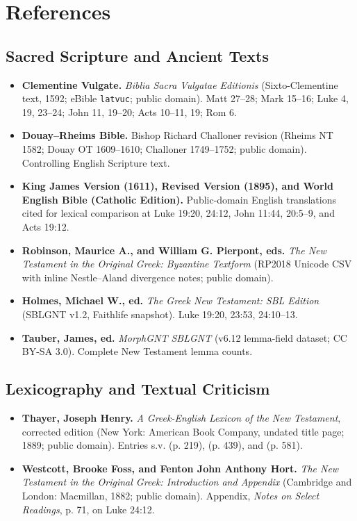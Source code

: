 \section{References}
\label{app:references}

\subsection{Sacred Scripture and Ancient Texts}

\begin{itemize}
\item \textbf{Clementine Vulgate.} \emph{Biblia Sacra Vulgatae Editionis} (Sixto-Clementine text, 1592; eBible \texttt{latvuc}; public domain). Matt 27--28; Mark 15--16; Luke 4, 19, 23--24; John 11, 19--20; Acts 10--11, 19; Rom 6.
\item \textbf{Douay--Rheims Bible.} Bishop Richard Challoner revision (Rheims NT 1582; Douay OT 1609--1610; Challoner 1749--1752; public domain). Controlling English Scripture text.
\item \textbf{King James Version (1611), Revised Version (1895), and World English Bible (Catholic Edition).} Public-domain English translations cited for lexical comparison at Luke 19:20, 24:12, John 11:44, 20:5--9, and Acts 19:12.
\item \textbf{Robinson, Maurice A., and William G. Pierpont, eds.} \emph{The New Testament in the Original Greek: Byzantine Textform} (RP2018 Unicode CSV with inline Nestle--Aland divergence notes; public domain).
\item \textbf{Holmes, Michael W., ed.} \emph{The Greek New Testament: SBL Edition} (SBLGNT v1.2, Faithlife snapshot). Luke 19:20, 23:53, 24:10--13.
\item \textbf{Tauber, James, ed.} \emph{MorphGNT SBLGNT} (v6.12 lemma-field dataset; CC BY-SA 3.0). Complete New Testament lemma counts.
\end{itemize}

\subsection{Lexicography and Textual Criticism}

\begin{itemize}
\item \textbf{Thayer, Joseph Henry.} \emph{A Greek-English Lexicon of the New Testament}, corrected edition (New York: American Book Company, undated title page; 1889; public domain). Entries s.v.  (p. 219),  (p. 439), and  (p. 581).
\item \textbf{Westcott, Brooke Foss, and Fenton John Anthony Hort.} \emph{The New Testament in the Original Greek: Introduction and Appendix} (Cambridge and London: Macmillan, 1882; public domain). Appendix, \emph{Notes on Select Readings}, p. 71, on Luke 24:12.
\end{itemize}

